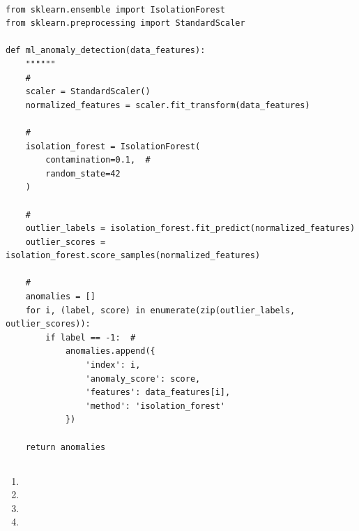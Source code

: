 \hypertarget{section-81}{%
\paragraph{}\label{section-81}}

\begin{lstlisting}[style=python]
from sklearn.ensemble import IsolationForest
from sklearn.preprocessing import StandardScaler

def ml_anomaly_detection(data_features):
    """"""
    # 
    scaler = StandardScaler()
    normalized_features = scaler.fit_transform(data_features)
    
    # 
    isolation_forest = IsolationForest(
        contamination=0.1,  # 
        random_state=42
    )
    
    # 
    outlier_labels = isolation_forest.fit_predict(normalized_features)
    outlier_scores = isolation_forest.score_samples(normalized_features)
    
    # 
    anomalies = []
    for i, (label, score) in enumerate(zip(outlier_labels, outlier_scores)):
        if label == -1:  # 
            anomalies.append({
                'index': i,
                'anomaly_score': score,
                'features': data_features[i],
                'method': 'isolation_forest'
            })
    
    return anomalies
\end{lstlisting}

\hypertarget{section-82}{%
\subsection{}\label{section-82}}

\important{}

\begin{enumerate}
\def\labelenumi{\arabic{enumi}.}
\item
  \important{}
\item
  \important{}
\item
  \important{}
\item
  \important{}
\end{enumerate}

\hypertarget{section-83}{%
\subsection{}\label{section-83}}

\hypertarget{section-84}{%
\subsubsection{}\label{section-84}}

